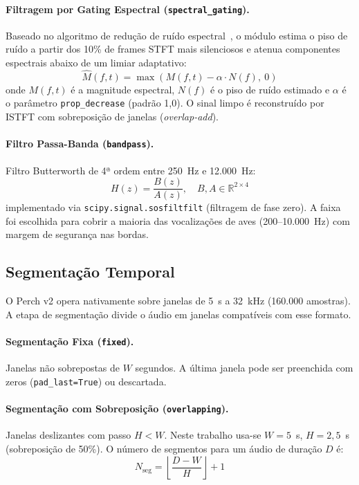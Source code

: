 \documentclass[12pt,a4paper]{article}
\begin{document}
\paragraph{Filtragem por Gating Espectral (\texttt{spectral\_gating}).}
Baseado no algoritmo de redução de ruído espectral~\cite{logothetis:96}, o
módulo estima o piso de ruído a partir dos 10\% de frames STFT mais silenciosos
e atenua componentes espectrais abaixo de um limiar adaptativo:
\begin{equation}
  \hat{M}(f,t) = \max\!\left(M(f,t) - \alpha \cdot N(f),\ 0\right)
  \label{eq:specgate}
\end{equation}
onde $M(f,t)$ é a magnitude espectral, $N(f)$ é o piso de ruído estimado e
$\alpha$ é o parâmetro \texttt{prop\_decrease} (padrão 1,0). O sinal limpo é
reconstruído por ISTFT com sobreposição de janelas (\emph{overlap-add}).

\paragraph{Filtro Passa-Banda (\texttt{bandpass}).}
Filtro Butterworth de 4ª ordem entre 250~Hz e 12.000~Hz:
\begin{equation}
  H(z) = \frac{B(z)}{A(z)},\quad B,A \in \mathbb{R}^{2 \times 4}
  \label{eq:bandpass}
\end{equation}
implementado via \texttt{scipy.signal.sosfiltfilt} (filtragem de fase zero).
A faixa foi escolhida para cobrir a maioria das vocalizações de aves (200--10.000~Hz)
com margem de segurança nas bordas.

\subsection{Segmentação Temporal}

O Perch v2 opera nativamente sobre janelas de 5~s a 32~kHz (160.000 amostras).
A etapa de segmentação divide o áudio em janelas compatíveis com esse formato.

\paragraph{Segmentação Fixa (\texttt{fixed}).}
Janelas não sobrepostas de $W$ segundos. A última janela pode ser preenchida
com zeros (\texttt{pad\_last=True}) ou descartada.

\paragraph{Segmentação com Sobreposição (\texttt{overlapping}).}
Janelas deslizantes com passo $H < W$. Neste trabalho usa-se $W = 5$~s,
$H = 2{,}5$~s (sobreposição de 50\%). O número de segmentos para um áudio de
duração $D$ é:
\begin{equation}
  N_{\text{seg}} = \left\lfloor \frac{D - W}{H} \right\rfloor + 1
  \label{eq:nseg}
\end{equation}
\end{document}
